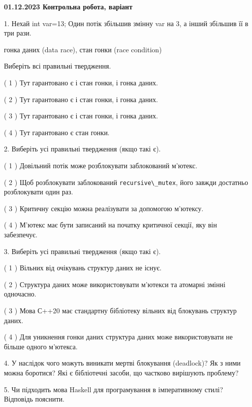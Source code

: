 \documentclass[12pt, ukrainian]{article}
\def\code#1{\Verb!#1!}
\begin{document}
\vspace{4mm}
\newpage
\begin {large}

\textbf{01.12.2023 Контрольна робота, варіант  }\par


{
1. Нехай int var=13; Один потік збільшив змінну var на 3, а інший збільшив її в три рази.

гонка даних (data race), стан гонки (race condition)

Виберіть всі правильні твердження.\par
\vspace{2mm}
( 1 ) Тут гарантовано є і стан гонки, і гонка даних.%

( 2 ) Тут гарантовано є і стан гонки, і гонка даних.%

( 3 ) Тут гарантовано є і стан гонки, і гонка даних.%

( 4 ) Тут гарантовано є стан гонки.%


\vspace{5mm}
2. Виберіть усі правильні твердження (якщо такі є).\par
\vspace{2mm}

( 1 ) Довільний потік може розблокувати заблокований м’ютекс.%

( 2 ) Щоб розблокувати заблокований \code{recursive\_mutex}, його завжди достатньо розблокувати один раз.%

( 3 ) Критичну секцію можна реалізувати за допомогою м’ютексу.%

( 4 ) М’ютекс має бути записаний на початку критичної секції, яку він забезпечує.%


\vspace{5mm}
3. Виберіть усі правильні твердження (якщо такі є).\par
\vspace{2mm}

( 1 ) Вільних від очікувань структур даних не існує.%

( 2 ) Структура даних може використовувати м’ютекси та атомарні змінні одночасно.%

( 3 ) Мова С++20 має стандартну бібліотеку вільних від блокувань структур даних.%

( 4 ) Для уникнення гонки даних структура даних може використовувати не більше одного м’ютекса.%


\vspace{5mm}
4. У наслідок чого можуть виникати мертві блокування (deadlock)? Як з ними можна боротися? Які є бібліотечні засоби, що частково вирішують проблему?



\vspace{5mm}
5. Чи підходить мова Haskell для програмування в імперативному стилі? Відповідь пояснити.
}
\end {large}
\end{document}
